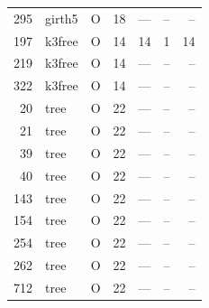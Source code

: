 \begin{tabular}{rllrrrr}
295 & girth5 & O & 18 & — & -- & -- \\
197 & k3free & O & 14 & 14 & 1 & 14 \\
219 & k3free & O & 14 & — & -- & -- \\
322 & k3free & O & 14 & — & -- & -- \\
20 & tree & O & 22 & — & -- & -- \\
21 & tree & O & 22 & — & -- & -- \\
39 & tree & O & 22 & — & -- & -- \\
40 & tree & O & 22 & — & -- & -- \\
143 & tree & O & 22 & — & -- & -- \\
154 & tree & O & 22 & — & -- & -- \\
254 & tree & O & 22 & — & -- & -- \\
262 & tree & O & 22 & — & -- & -- \\
712 & tree & O & 22 & — & -- & -- \\
\hline
\end{tabular}
